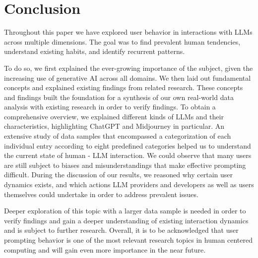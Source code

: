 \section{Conclusion}
\label{sec:conclusion}

Throughout this paper we have explored user behavior in interactions with LLMs across multiple
dimensions.
The goal was to find prevalent human tendencies, understand existing habits, and identify recurrent
patterns.

To do so, we first explained the ever-growing importance of the subject, given the increasing
use of generative AI across all domains.
We then laid out fundamental concepts and explained existing findings from related research.
These concepts and findings built the foundation for a synthesis of our own real-world
data analysis with existing research in order to verify findings.
To obtain a comprehensive overview, we explained different kinds of LLMs and their
characteristics, highlighting ChatGPT and Midjourney in particular.
An extensive study of data samples that encompassed a categorization of each individual
entry according to eight predefined categories helped us to understand the current state of
human - LLM interaction.
We could observe that many users are still subject to biases and misunderstandings that make
effective prompting difficult.
During the discussion of our results, we reasoned why certain user dynamics exists, and which
actions LLM providers and developers as well as users themselves could undertake in order to
address prevalent issues.

Deeper exploration of this topic with a larger data sample is needed in order to
verify findings and gain a deeper understanding of existing interaction dynamics and is subject to
further research.
Overall, it is to be acknowledged that user prompting behavior is one of the most relevant
research topics in human centered computing and will gain even more importance in the near future.